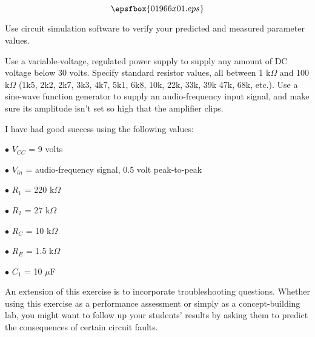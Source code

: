 

$$\epsfbox{01966x01.eps}$$

\vfil \eject






Use circuit simulation software to verify your predicted and measured parameter values.







Use a variable-voltage, regulated power supply to supply any amount of DC voltage below 30 volts.  Specify standard resistor values, all between 1 k$\Omega$ and 100 k$\Omega$ (1k5, 2k2, 2k7, 3k3, 4k7, 5k1, 6k8, 10k, 22k, 33k, 39k 47k, 68k, etc.).  Use a sine-wave function generator to supply an audio-frequency input signal, and make sure its amplitude isn't set so high that the amplifier clips.

I have had good success using the following values:

\medskip
\item{$\bullet$} $V_{CC}$ = 9 volts
\item{$\bullet$} $V_{in}$ = audio-frequency signal, 0.5 volt peak-to-peak
\item{$\bullet$} $R_1$ = 220 k$\Omega$
\item{$\bullet$} $R_2$ = 27 k$\Omega$
\item{$\bullet$} $R_C$ = 10 k$\Omega$
\item{$\bullet$} $R_E$ = 1.5 k$\Omega$
\item{$\bullet$} $C_1$ = 10 $\mu$F
\medskip

An extension of this exercise is to incorporate troubleshooting questions.  Whether using this exercise as a performance assessment or simply as a concept-building lab, you might want to follow up your students' results by asking them to predict the consequences of certain circuit faults.




